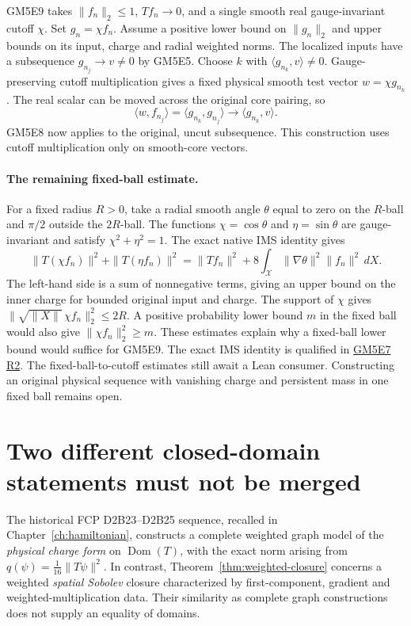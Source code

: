 GM5E9 takes \(\|f_n\|_2\le1\), \(Tf_n\to0\), and a single smooth real
gauge-invariant cutoff \(\chi\). Set \(g_n=\chi f_n\). Assume a positive
lower bound on \(\|g_n\|_2\) and upper bounds on its input, charge and radial
weighted norms. The localized inputs have a subsequence \(g_{n_j}\to v\ne0\)
by GM5E5. Choose \(k\) with \(\langle g_{n_k},v\rangle\ne0\).
Gauge-preserving cutoff multiplication gives a fixed physical smooth
test vector \(w=\chi g_{n_k}\). The real scalar can be moved across the
original core pairing, so
\[
\langle w,f_{n_j}\rangle
  =\langle g_{n_k},g_{n_j}\rangle
  \longrightarrow \langle g_{n_k},v\rangle .
\]
GM5E8 now applies to the original, uncut subsequence. This construction
uses cutoff multiplication only on smooth-core vectors.


\paragraph{The remaining fixed-ball estimate.}
For a fixed radius \(R>0\), take a radial smooth angle \(\theta\)
equal to zero on the \(R\)-ball and \(\pi/2\) outside the \(2R\)-ball.
The functions \(\chi=\cos\theta\) and \(\eta=\sin\theta\) are
gauge-invariant and satisfy \(\chi^2+\eta^2=1\).
The exact native IMS identity gives
\[
\|T(\chi f_n)\|^2 + \|T(\eta f_n)\|^2
=\|Tf_n\|^2+8\int_{\mathcal X}\|\nabla\theta\|^2\|f_n\|^2\,dX .
\]
The left-hand side is a sum of nonnegative terms, giving an upper bound
on the inner charge for bounded original input and charge. The support
of \(\chi\) gives \(\|\sqrt{\|X\|}\,\chi f_n\|_2^2\le 2R\).
A positive probability lower bound \(m\) in the fixed ball would also give
\(\|\chi f_n\|_2^2\ge m\). These estimates explain why a fixed-ball
lower bound would suffice for GM5E9. The exact IMS identity is qualified
in \href{https://github.com/etblink/math/actions/runs/45201004845}{GM5E7 R2}.
The fixed-ball-to-cutoff estimates still await a Lean consumer.
Constructing an original physical sequence with vanishing charge and
persistent mass in one fixed ball remains open.

\section{Two different closed-domain statements must not be merged}
The historical FCP D2B23--D2B25 sequence, recalled in
Chapter~\ref{ch:hamiltonian}, constructs a complete weighted graph
model of the \emph{physical charge form} on
\(\operatorname{Dom}(T)\), with the exact norm arising from
\(q(\psi)=\frac1{16}\|T\psi\|^2\). In contrast,
Theorem~\ref{thm:weighted-closure} concerns a weighted \emph{spatial
Sobolev} closure characterized by first-component, gradient and
weighted-multiplication data. Their similarity as complete graph
constructions does not supply an equality of domains.

